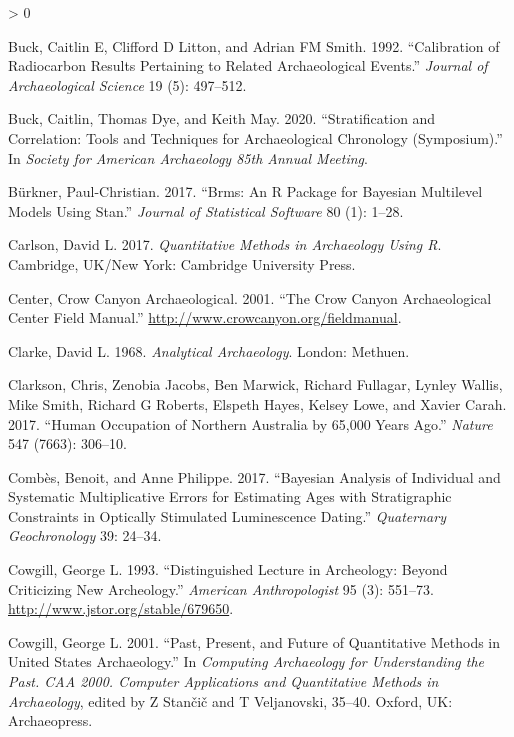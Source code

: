 \documentclass[
]{article}
\newlength{\cslhangindent}
\newenvironment{CSLReferences}[2] %
 {%
  \setlength{\parindent}{0pt}
  \ifodd #1 \everypar{\setlength{\hangindent}{\cslhangindent}}\ignorespaces\fi
  \ifnum #2 > 0
  \setlength{\parskip}{#2\baselineskip}
  \fi
 }%
 {}
\begin{document}
\begin{CSLReferences}{1}{0}
\leavevmode\hypertarget{ref-buck_calibration_1992}{}%
Buck, Caitlin E, Clifford D Litton, and Adrian FM Smith. 1992.
{``Calibration of Radiocarbon Results Pertaining to Related
Archaeological Events.''} \emph{Journal of Archaeological Science} 19
(5): 497--512.

\leavevmode\hypertarget{ref-buck_stratification_2020}{}%
Buck, Caitlin, Thomas Dye, and Keith May. 2020. {``Stratification and
{Correlation}: {Tools} and {Techniques} for {Archaeological}
{Chronology} ({Symposium}).''} In \emph{Society for {American}
{Archaeology} 85th {Annual} {Meeting}}.

\leavevmode\hypertarget{ref-burkner_brms_2017}{}%
Bürkner, Paul-Christian. 2017. {``Brms: {An} {R} Package for {Bayesian}
Multilevel Models Using {Stan}.''} \emph{Journal of Statistical
Software} 80 (1): 1--28.

\leavevmode\hypertarget{ref-carlson_quantitative_2017}{}%
Carlson, David L. 2017. \emph{Quantitative {Methods} in {Archaeology}
{Using} {R}}. Cambridge, UK/New York: Cambridge University Press.

\leavevmode\hypertarget{ref-crow_crow_2001}{}%
Center, Crow Canyon Archaeological. 2001. {``The Crow Canyon
Archaeological Center Field Manual.''}
\url{http://www.crowcanyon.org/fieldmanual}.

\leavevmode\hypertarget{ref-clarke_analytical_1968}{}%
Clarke, David L. 1968. \emph{Analytical {Archaeology}}. London: Methuen.

\leavevmode\hypertarget{ref-clarkson_human_2017}{}%
Clarkson, Chris, Zenobia Jacobs, Ben Marwick, Richard Fullagar, Lynley
Wallis, Mike Smith, Richard G Roberts, Elspeth Hayes, Kelsey Lowe, and
Xavier Carah. 2017. {``Human Occupation of Northern {Australia} by
65,000 Years Ago.''} \emph{Nature} 547 (7663): 306--10.

\leavevmode\hypertarget{ref-combes_bayesian_2017}{}%
Combès, Benoit, and Anne Philippe. 2017. {``Bayesian Analysis of
Individual and Systematic Multiplicative Errors for Estimating Ages with
Stratigraphic Constraints in Optically Stimulated Luminescence
Dating.''} \emph{Quaternary Geochronology} 39: 24--34.

\leavevmode\hypertarget{ref-cowgill_distinguished_1993}{}%
Cowgill, George L. 1993. {``Distinguished {Lecture} in {Archeology}:
{Beyond} {Criticizing} {New} {Archeology}.''} \emph{American
Anthropologist} 95 (3): 551--73.
\url{http://www.jstor.org/stable/679650}.

\leavevmode\hypertarget{ref-cowgill_past_2001}{}%
Cowgill, George L. 2001. {``Past, Present, and Future of Quantitative
Methods in {United} {States} Archaeology.''} In \emph{Computing
{Archaeology} for {Understanding} the {Past}. {CAA} 2000. {Computer}
{Applications} and {Quantitative} {Methods} in {Archaeology}}, edited by
Z Stančič and T Veljanovski, 35--40. Oxford, UK: Archaeopress.


\end{CSLReferences}
\end{document}
